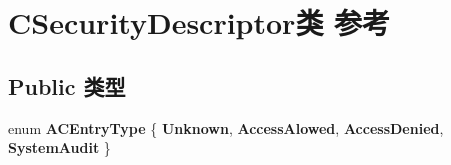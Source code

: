 \hypertarget{class_c_security_descriptor}{}\section{C\+Security\+Descriptor类 参考}
\label{class_c_security_descriptor}
\subsection*{Public 类型}
\begin{DoxyCompactItemize}
\item 
\mbox{\label{class_c_security_descriptor_a1c4ae670986a0ae174f53045ab9aabd1}} 
enum {\bfseries A\+C\+Entry\+Type} \{ {\bfseries Unknown}, 
{\bfseries Access\+Alowed}, 
{\bfseries Access\+Denied}, 
{\bfseries System\+Audit}
 \}
\end{DoxyCompactItemize}
